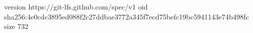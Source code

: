 version https://git-lfs.github.com/spec/v1
oid sha256:4e0cdc3895ed088f2c27ddbae3772a345f7ecd75befc19bc5941143e74b498fc
size 732
